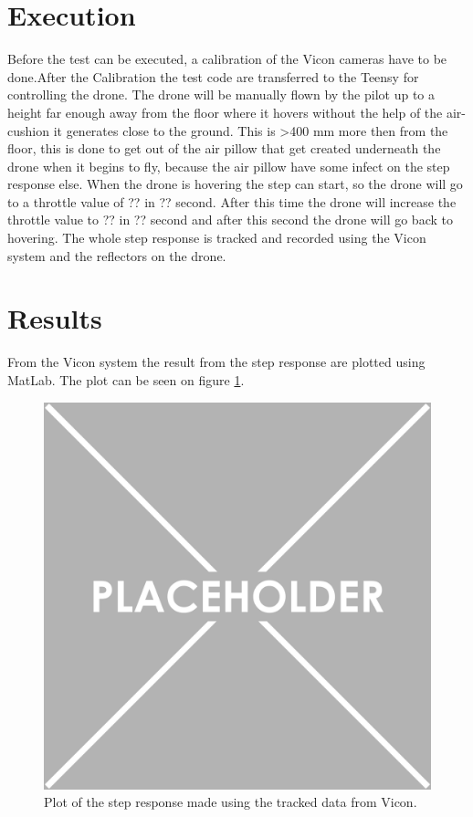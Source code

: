 \section*{Execution}
Before the test can be executed, a calibration of the Vicon cameras have to be done.After the Calibration the test code are transferred to the Teensy for controlling the drone. The drone will be manually flown by the pilot up to a height far enough away from the floor where it hovers without the help of the air-cushion it generates close to the ground. This is >400 mm more then from the floor, this is done to get out of the air pillow that get created underneath the drone when it begins to fly, because the air pillow have some infect on the step response else. When the drone is hovering the step can start, so the drone will go to a throttle value of ?? in ?? second. After this time the drone will increase the throttle value to ?? in ?? second and after this second the drone will go back to hovering. The whole step response is tracked and recorded using the Vicon system and the reflectors on the drone.


\section*{Results}
From the Vicon system the result from the step response are plotted using MatLab. The plot can be seen on figure \ref{fig:secondary_stepresponse}.
\begin{figure}
    \centering
    \includegraphics{figures/Placeholder.png}
    \caption{Plot of the step response made using the tracked data from Vicon.}
    \label{fig:secondary_stepresponse}
\end{figure}

